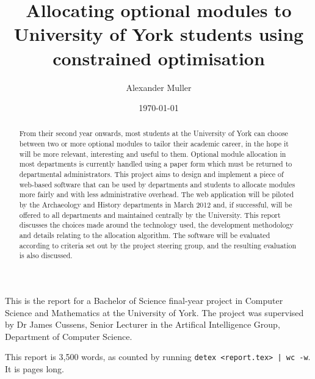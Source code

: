 \documentclass[]{scrartcl}
\title{Allocating optional modules to University of York students using constrained optimisation}
\author{Alexander Muller}
\date{\today}
\begin{document}
\ifpdf
{}
\else
{}
\fi

\maketitle

This is the report for a Bachelor of Science final-year project in Computer
Science and Mathematics at the University of York. The project was supervised
by Dr James Cussens, Senior Lecturer in the Artifical Intelligence Group,
Department of Computer Science.

This report is 3,500 words, as counted by running \texttt{detex <report.tex> |
wc -w}. It is \pageref{LastPage} pages long.


\newpage

\begin{abstract}
  From their second year onwards, most students at the University of York can
  choose between two or more optional modules to tailor their academic career,
  in the hope it will be more relevant, interesting and useful to them.
  Optional module allocation in most departments is currently handled using a
  paper form which must be returned to departmental administrators. This project
  aims to design and implement a piece of web-based software that can be used by
  departments and students to allocate modules more fairly and with less
  administrative overhead.
  The web application will be piloted by the Archaeology and History departments
  in March 2012 and, if successful, will be offered to all departments and
  maintained centrally by the University.
  This report discusses the choices made around the technology used, the
  development methodology and details relating to the allocation algorithm.
  The software will be evaluated according to criteria set out by the project
  steering group, and the resulting evaluation is also discussed.
\end{abstract}

\newpage

\tableofcontents

\newpage
\end{document}
